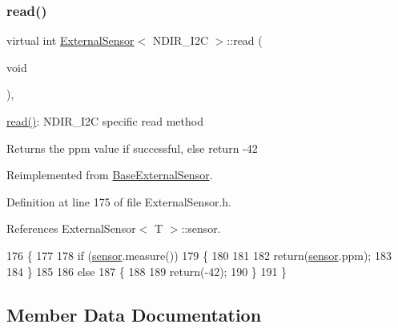 \subsubsection{\texorpdfstring{read()}{read()}}
{\footnotesize\ttfamily virtual int \hyperlink{classExternalSensor}{External\+Sensor}$<$ N\+D\+I\+R\+\_\+\+I2C $>$\+::read (\begin{DoxyParamCaption}\item[{void}]{ }\end{DoxyParamCaption})\hspace{0.3cm}{\ttfamily [inline]}, {\ttfamily [virtual]}}

\hyperlink{classExternalSensor_3_01NDIR__I2C_01_4_add67f5ecaf47d2ee675e8299aee7322d}{read()}\+: N\+D\+I\+R\+\_\+\+I2C specific read method

\begin{DoxyReturn}{Returns}
the ppm value if successful, else return -\/42 
\end{DoxyReturn}


Reimplemented from \hyperlink{classBaseExternalSensor_a7e0a98f350148d7645031315657aa5ec}{Base\+External\+Sensor}.



Definition at line 175 of file External\+Sensor.\+h.



References External\+Sensor$<$ T $>$\+::sensor.


\begin{DoxyCode}
176     \{
177 
178         \textcolor{keywordflow}{if} (\hyperlink{classExternalSensor_3_01NDIR__I2C_01_4_ae541c9cece7c38674b70114cdb74a7dc}{sensor}.measure())
179         \{
180 
181 
182             \textcolor{keywordflow}{return}(\hyperlink{classExternalSensor_3_01NDIR__I2C_01_4_ae541c9cece7c38674b70114cdb74a7dc}{sensor}.ppm);
183             
184         \}
185         
186         \textcolor{keywordflow}{else}
187         \{
188 
189             \textcolor{keywordflow}{return}(-42);
190         \}
191     \}
\end{DoxyCode}


\subsection{Member Data Documentation}
\mbox{\label{classExternalSensor_3_01NDIR__I2C_01_4_ae541c9cece7c38674b70114cdb74a7dc}} 
